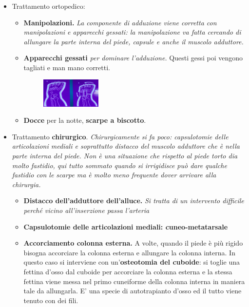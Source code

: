 \begin{itemize}
\item
  Trattamento ortopedico:
\begin{itemize}
\item
  \textbf{Manipolazioni.} \emph{La componente di adduzione viene corretta con manipolazioni e apparecchi gessati: la manipolazione va fatta cercando di allungare la parte interna del piede, capsule e anche il muscolo adduttore.}
\item
  \textbf{Apparecchi gessati} \emph{per dominare l'adduzione.} Questi gessi poi vengono tagliati e man mano corretti.

\begin{figure}[!ht]
\centering
\includegraphics[width=0.3\textwidth]{016/image50.png}
\end{figure}

\item
  \textbf{Docce} per la notte, \textbf{scarpe a biscotto}.
\end{itemize}

\item
  Trattamento \textbf{chirurgico}. \emph{Chirurgicamente si fa poco: capsulotomie delle articolazioni mediali e soprattutto distacco del muscolo adduttore che è nella parte interna del piede. Non è una situazione che rispetto al piede torto dia molto fastidio, qui tutto sommato quando si irrigidisce può dare qualche fastidio con le scarpe ma è molto meno frequente dover arrivare alla chirurgia.}

\begin{itemize}
\item
  \textbf{Distacco dell'adduttore dell'alluce.} \emph{Si tratta di un intervento difficile perché vicino all'inserzione passa l'arteria}
\item
  \textbf{Capsulotomie delle articolazioni mediali: cuneo-metatarsale}
\item
  \textbf{Accorciamento colonna esterna.} A volte, quando il piede è più rigido bisogna accorciare la colonna esterna e allungare la colonna interna. In questo caso si interviene con un'\textbf{osteotomia del cuboide}: si toglie una fettina d'osso dal cuboide per accorciare la colonna esterna e la stessa fettina viene messa nel primo cuneiforme della colonna interna in maniera tale da allungarla. E' una specie di autotrapianto d'osso ed il tutto viene tenuto con dei fili.


\end{itemize}
\end{itemize}
